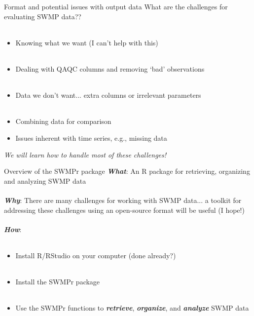 \documentclass[xcolor=svgnames]{beamer}\usepackage[]{graphicx}\usepackage[]{color}
\newcommand{\Bigtxt}[1]{\textbf{\textit{#1}}}
\begin{document}
\begin{frame}{Format and potential issues with output data}
\onslide<+->
What are the challenges for evaluating SWMP data?? \\~\\
\onslide<+->
\begin{itemize}
\item Knowing what we want (I can't help with this) \\~\\
\onslide<+->
\item Dealing with QAQC columns and removing `bad' observations \\~\\
\onslide<+->
\item Data we don't want... extra columns or irrelevant parameters \\~\\
\onslide<+->
\item Combining data for comparison
\onslide<+-> 
\item Issues inherent with time series, e.g., missing data
\end{itemize}
\onslide<+->
\centerline{\emph{We will learn how to handle most of these challenges!}}
\end{frame}

\begin{frame}{Overview of the SWMPr package}
\onslide<+->
\textbf{\emph{What}}: An R package for retrieving, organizing and analyzing SWMP data \\~\\
\onslide<+->
\Bigtxt{Why}: There are many challenges for working with SWMP data... a toolkit for addressing these challenges using an open-source format will be useful (I hope!) \\~\\
\onslide<+->
\Bigtxt{How}: \\~\\
\begin{itemize}
\item Install R/RStudio on your computer (done already?) \\~\\
\item Install the SWMPr package \\~\\
\item Use the SWMPr functions to \Bigtxt{retrieve}, \Bigtxt{organize}, and \Bigtxt{analyze} SWMP data 
\end{itemize}
\end{frame}
\end{document}
